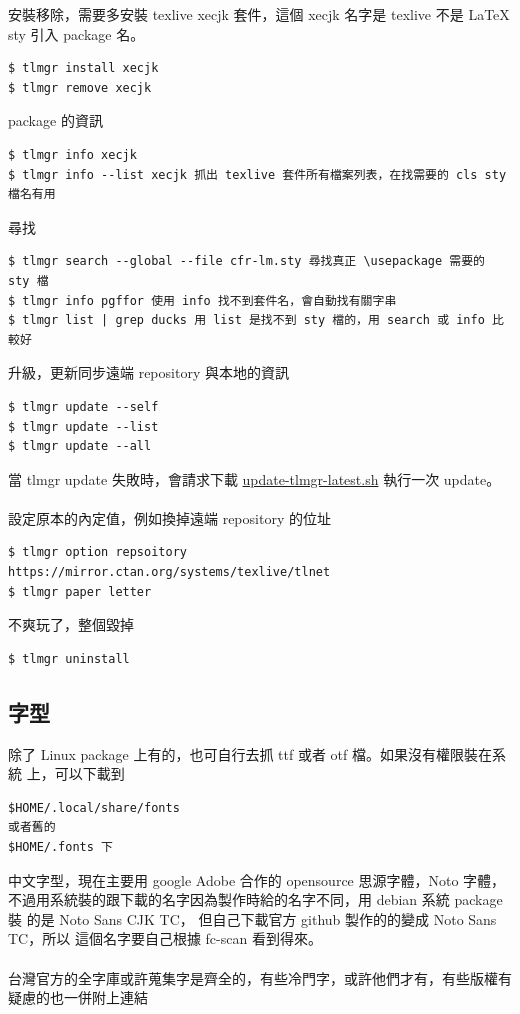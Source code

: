 安裝移除，需要多安裝 texlive xecjk 套件，這個 xecjk 名字是 texlive 不是
\LaTeX{} sty 引入 package 名。
\begin{verbatim}
$ tlmgr install xecjk
$ tlmgr remove xecjk
\end{verbatim}
package 的資訊
\begin{verbatim}
$ tlmgr info xecjk
$ tlmgr info --list xecjk 抓出 texlive 套件所有檔案列表，在找需要的 cls sty 檔名有用
\end{verbatim}
尋找
\begin{verbatim}
$ tlmgr search --global --file cfr-lm.sty 尋找真正 \usepackage 需要的 sty 檔
$ tlmgr info pgffor 使用 info 找不到套件名，會自動找有關字串
$ tlmgr list | grep ducks 用 list 是找不到 sty 檔的，用 search 或 info 比較好
\end{verbatim}
升級，更新同步遠端 repository 與本地的資訊
\begin{verbatim}
$ tlmgr update --self
$ tlmgr update --list
$ tlmgr update --all
\end{verbatim}
當 tlmgr update 失敗時，會請求下載
\href{https://mirrors.ctan.org/systems/texlive/tlnet/update-tlmgr-latest.sh}
{update-tlmgr-latest.sh} 執行一次 update。
\\\\
設定原本的內定值，例如換掉遠端 repository 的位址
\begin{verbatim}
$ tlmgr option repsoitory https://mirror.ctan.org/systems/texlive/tlnet
$ tlmgr paper letter
\end{verbatim}
不爽玩了，整個毀掉
\begin{verbatim}
$ tlmgr uninstall
\end{verbatim}

  \subsection{字型}
  除了 Linux package 上有的，也可自行去抓 ttf 或者 otf 檔。如果沒有權限裝在系統
  上，可以下載到
  \begin{verbatim}
$HOME/.local/share/fonts 
或者舊的
$HOME/.fonts 下
  \end{verbatim}

中文字型，現在主要用 google Adobe 合作的 opensource 思源字體，Noto 字體，
不過用系統裝的跟下載的名字因為製作時給的名字不同，用 debian 系統 package 裝
的是 Noto Sans CJK TC， 但自己下載官方 github 製作的的變成 Noto Sans TC，所以
這個名字要自己根據 fc-scan 看到得來。
\\\\
台灣官方的全字庫或許蒐集字是齊全的，有些冷門字，或許他們才有，有些版權有
疑慮的也一併附上連結


